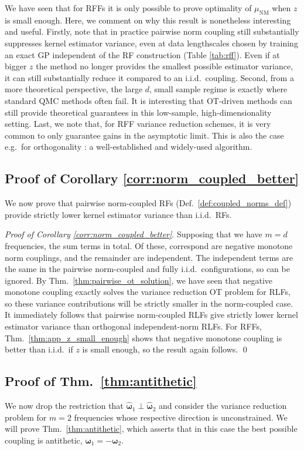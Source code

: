 We have seen that for RFFs it is only possible to prove optimality of $\mu_\textrm{NM}$ when $z$ is small enough. 
Here, we comment on why this result is nonetheless interesting and useful.
Firstly, note that in practice pairwise norm coupling still substantially suppresses kernel estimator variance, even at data lengthscales chosen by training an exact GP independent of the RF construction (Table \ref{tab:rff}). 
Even if at bigger $z$ the method no longer provides the smallest possible estimator variance, it can still substantially reduce it compared to an i.i.d.~coupling.
Second, from a more theoretical perspective, the large $d$, small sample regime is exactly where standard QMC methods often fail.
It is interesting that OT-driven methods can still provide theoretical guarantees in this low-sample, high-dimensionality setting.
Last, we note that, for RFF variance reduction schemes, it is very common to only guarantee gains in the asymptotic limit. 
This is also the case e.g.~for orthogonality \citep{simrfs,yu2016orthogonal}: a well-established and widely-used algorithm.


\subsection{Proof of Corollary \ref{corr:norm_coupled_better}}
We now prove that pairwise norm-coupled RFs (Def.~\ref{def:coupled_norms_def}) provide strictly lower kernel estimator variance than i.i.d.~RFs.

\emph{Proof of Corollary \ref{corr:norm_coupled_better}}. 
Supposing that we have $m=d$ frequencies, the sum  terms in total. 
Of these,  correspond are negative monotone norm couplings, and the remainder are independent. 
The independent terms are the same in the pairwise norm-coupled and fully i.i.d.~configurations, so can be ignored. 
By Thm.~\ref{thm:pairwise_ot_solution}, we have seen that negative monotone coupling exactly solves the variance reduction OT problem for RLFs, so these variance contributions will be strictly smaller in the norm-coupled case.
It immediately follows that pairwise norm-coupled RLFs give strictly lower kernel estimator variance than orthogonal independent-norm RLFs.
For RFFs, Thm.~\ref{thm:app_z_small_enough} shows that negative monotone coupling is better than i.i.d.~if $z$ is small enough, so the result again follows.
\qed

\subsection{Proof of Thm.~\ref{thm:antithetic}}
We now drop the restriction that $\widehat{\boldsymbol{\omega}}_1 \perp \widehat{\boldsymbol{\omega}}_2$ and consider the variance reduction problem for $m=2$ frequencies whose respective direction is unconstrained.
We will prove Thm.~\ref{thm:antithetic}, which asserts that in this case the best possible coupling is antithetic, $\boldsymbol{\omega}_1 = - \boldsymbol{\omega}_2$.

